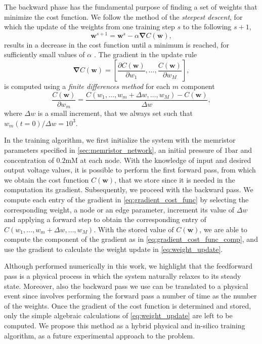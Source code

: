 \documentclass[reprint,superscriptaddress,prb,showkeys]{revtex4-2}
\newcommand{\brac}[1]{\left(#1 \right)} %
\begin{document}
The backward phase has the fundamental purpose of finding a set of weights that minimize the cost function. We follow the method of the      \textit{steepest descent}, for which the update of the weights from one training step $s$ to the following $s+1$,
\begin{equation}
\boldsymbol{w}^{s+1} = \boldsymbol{w}^{s} - \alpha \boldsymbol{\nabla}C\brac{\boldsymbol{w}},
\label{eq:weight_update}
\end{equation}
results in a decrease in the cost function until a minimum is reached, for sufficiently small values of $\alpha$ \cite{steepest_descent_book}. The gradient in the update rule
\begin{equation}
    \boldsymbol{\nabla}C\brac{\boldsymbol{w}} = \left[ \frac{\partial C(\boldsymbol{w})}{\partial w_1}, \dots, \frac{C(\boldsymbol{w})}{\partial w_M}  \right],
    \label{eq:gradient_cost_func}
\end{equation}
is computed using a \textit{finite differences method} for each $m$ component
\begin{equation}
\frac{C(\boldsymbol{w})}{\partial w_m} = \frac{C\brac{w_1, \dots, w_m +\Delta w, \dots, w_M}-C\brac{\boldsymbol{w}}}{\Delta w},
\label{eq:gradient_cost_func_comp}
\end{equation}
where $\Delta w$ is a small increment, that we always set such that $w_m(t=0)/\Delta w = 10^{3}$.

In the training algorithm, we first initialize the system with the memristor parameters specified in \cref{sec:memristor_network}, an initial pressure of $1\text{bar}$ and concentration of $0.2\text{mM}$ at each node. With the knowledge of input and desired output voltage values, it is possible to perform the first forward pass, from which we obtain the cost function $C\brac{\boldsymbol{w}}$, that we store since it is needed in the computation its gradient. Subsequently, we proceed with the backward pass. We compute each entry of the gradient in \cref{eq:gradient_cost_func} by selecting the corresponding weight, a node or an edge parameter, increment its value of $\Delta w$ and applying a forward step to obtain the corresponding entry of $C\brac{w_1, \dots, w_m +\Delta w, \dots, w_M}$. With the stored value of $C\brac{\boldsymbol{w}}$, we are able to compute the component of the gradient as in \cref{eq:gradient_cost_func_comp}, and use the gradient to calculate the weight update in \cref{eq:weight_update}. 

Although performed numerically in this work, we highlight that the feedforward pass is a physical process in which the system naturally relaxes to its steady state. Moreover, also the backward pass we use can be translated to a physical event since involves performing the forward pass a number of time as the number of the weights. Once the gradient of the cost function is determined and stored, only the simple algebraic calculations of \cref{eq:weight_update} are left to be computed. We propose this method as a hybrid physical and in-silico training algorithm, as a future experimental approach to the problem.
\end{document}
